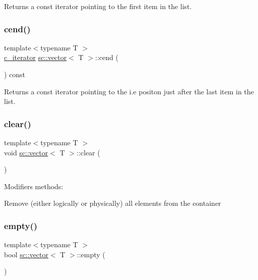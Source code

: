 Returns a const iterator pointing to the first item in the list. 

\mbox{\label{classsc_1_1vector_a1ab4f567a393988471cc01a206524dee}} 
\subsubsection{\texorpdfstring{cend()}{cend()}}
{\footnotesize\ttfamily template$<$typename T $>$ \\
\hyperlink{classsc_1_1vector_1_1c__iterator}{c\+\_\+iterator} \hyperlink{classsc_1_1vector}{sc\+::vector}$<$ T $>$\+::cend (\begin{DoxyParamCaption}{ }\end{DoxyParamCaption}) const\hspace{0.3cm}{\ttfamily [inline]}}



Returns a const iterator pointing to the i.\+e positon just after the last item in the list. 

\mbox{\label{classsc_1_1vector_a17c6d622cf64278d03feac9c38fa3684}} 
\subsubsection{\texorpdfstring{clear()}{clear()}}
{\footnotesize\ttfamily template$<$typename T $>$ \\
void \hyperlink{classsc_1_1vector}{sc\+::vector}$<$ T $>$\+::clear (\begin{DoxyParamCaption}{ }\end{DoxyParamCaption})\hspace{0.3cm}{\ttfamily [inline]}}



Modifiers methods\+: 

Remove (either logically or physically) all elements from the container \mbox{\label{classsc_1_1vector_a74d59d93240b308c7b4409af489bc3c5}} 
\subsubsection{\texorpdfstring{empty()}{empty()}}
{\footnotesize\ttfamily template$<$typename T $>$ \\
bool \hyperlink{classsc_1_1vector}{sc\+::vector}$<$ T $>$\+::empty (\begin{DoxyParamCaption}{ }\end{DoxyParamCaption})\hspace{0.3cm}{\ttfamily [inline]}}

